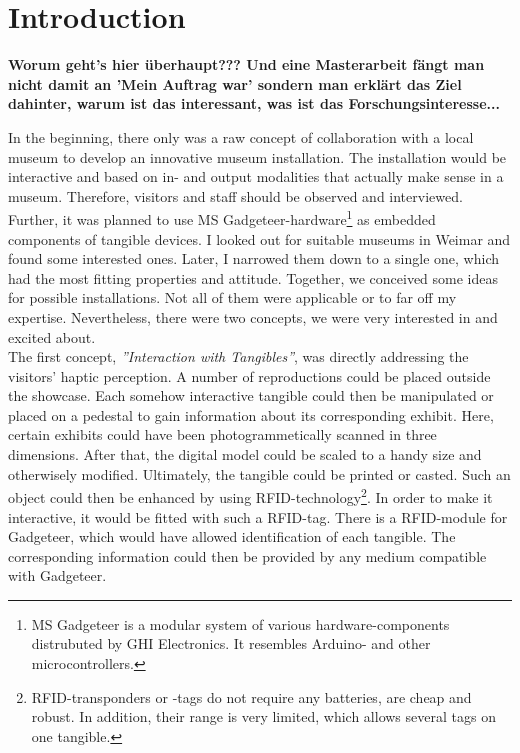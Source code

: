 \chapter{Introduction}
\label{introduction}

\textbf{Worum geht's hier überhaupt??? Und eine Masterarbeit fängt man nicht damit an 'Mein Auftrag war' sondern man erklärt das Ziel dahinter, warum ist das interessant, was ist das Forschungsinteresse...}

In the beginning, there only was a raw concept of collaboration with a local museum to develop an innovative museum installation. The installation would be interactive and based on in- and output modalities that actually make sense in a museum. Therefore, visitors and staff should be observed and interviewed. Further, it was planned to use \ac{MS} Gadgeteer-hardware\footnote{\ac{MS} Gadgeteer is a modular system of various hardware-components distrubuted by GHI Electronics. It resembles Arduino- and other microcontrollers.} as embedded components of tangible devices.
I looked out for suitable museums in Weimar and found some interested ones. Later, I narrowed them down to a single one, which had the most fitting properties and attitude. Together, we conceived some ideas for possible installations. Not all of them were applicable or to far off my expertise. Nevertheless, there were two concepts, we were very interested in and excited about.
\\
The first concept, \textit{''Interaction with Tangibles''}, was directly addressing the visitors' haptic perception. A number of reproductions could be placed outside the showcase. Each somehow interactive tangible could then be manipulated or placed on a pedestal to gain information about its corresponding exhibit. Here, certain exhibits could have been photogrammetically scanned in three dimensions. After that, the digital model could be scaled to a handy size and otherwisely modified. Ultimately, the tangible could be printed or casted. Such an object could then be enhanced by using \ac{RFID}-technology\footnote{RFID-transponders or -tags do not require any batteries, are cheap and robust. In addition, their range is very limited, which allows several tags on one tangible.}. In order to make it interactive, it would be fitted with such a \ac{RFID}-tag. There is a \ac{RFID}-module for Gadgeteer, which would have allowed identification of each tangible. The corresponding information could then be provided by any medium compatible with Gadgeteer.
